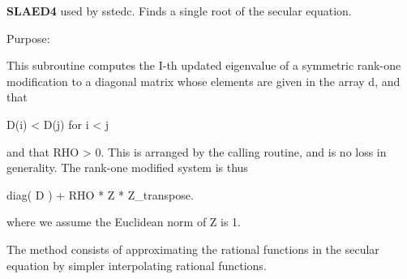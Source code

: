 {\bfseries S\+L\+A\+E\+D4} used by sstedc. Finds a single root of the secular equation. 

 \begin{DoxyParagraph}{Purpose\+: }
\begin{DoxyVerb} This subroutine computes the I-th updated eigenvalue of a symmetric
 rank-one modification to a diagonal matrix whose elements are
 given in the array d, and that

            D(i) < D(j)  for  i < j

 and that RHO > 0.  This is arranged by the calling routine, and is
 no loss in generality.  The rank-one modified system is thus

            diag( D )  +  RHO * Z * Z_transpose.

 where we assume the Euclidean norm of Z is 1.

 The method consists of approximating the rational functions in the
 secular equation by simpler interpolating rational functions.\end{DoxyVerb}
 
\end{DoxyParagraph}

